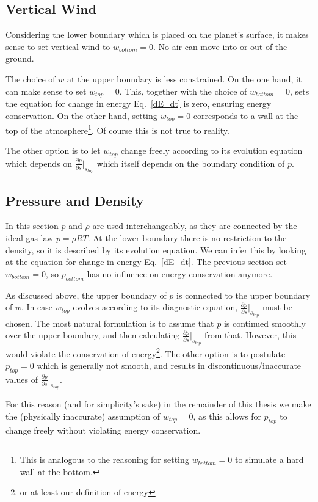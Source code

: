 \subsection{Vertical Wind}
Considering the lower boundary which is placed on the planet's surface, it makes sense to set vertical wind to $w_{bottom}=0$.
No air can move into or out of the ground.

The choice of $w$ at the upper boundary is less constrained.
On the one hand, it can make sense to set $w_{top}=0$.
This, together with the choice of $w_{bottom}=0$, sets the equation for change in energy Eq.~\ref{dE_dt} is zero, ensuring energy conservation.
On the other hand, setting $w_{top}=0$ corresponds to a wall at the top of the atmosphere\footnote{This is analogous to the reasoning for setting $w_{bottom}=0$ to simulate a hard wall at the bottom.}.
Of course this is not true to reality.

The other option is to let $w_{top}$ change freely according to its evolution equation which depends on $\frac{\partial p}{\partial s}\rvert _{s_{top}}$ which itself depends on the boundary condition of $p$.
\subsection{Pressure and Density}
In this section $p$ and $\rho$ are used interchangeably, as they are connected by the ideal gas law $p=\rho RT$.
At the lower boundary there is no restriction to the density, so it is described by its evolution equation.
We can infer this by looking at the equation for change in energy Eq.~\ref{dE_dt}.
The previous section set $w_{bottom}=0$, so $p_{bottom}$ has no influence on energy conservation anymore.

As discussed above, the upper boundary of $p$ is connected to the upper boundary of $w$.
In case $w_{top}$ evolves according to its diagnostic equation, $\frac{\partial p}{\partial s}\rvert _{s_{top}}$ must be chosen.
The most natural formulation is to assume that $p$ is continued smoothly over the upper boundary, and then calculating $\frac{\partial p}{\partial s}\rvert _{s_{top}}$ from that.
However, this would violate the conservation of energy\footnote{or at least our definition of energy}.
The other option is to postulate $p_{top}=0$ which is generally not smooth, and results in discontinuous/inaccurate values of $\frac{\partial p}{\partial s}\rvert _{s_{top}}$.

For this reason (and for simplicity's sake) in the remainder of this thesis we make the (physically inaccurate) assumption of $w_{top}=0$, as this allows for $p_{top}$ to change freely without violating energy conservation.

